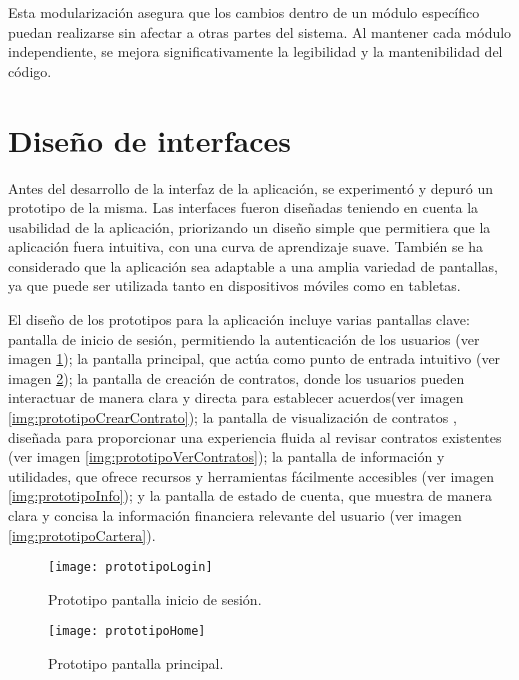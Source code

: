 Esta modularización asegura que los cambios dentro de un módulo específico puedan realizarse sin afectar a otras partes del sistema. Al mantener cada módulo independiente, se mejora significativamente la legibilidad y la mantenibilidad del código.

\section{Diseño de interfaces}

Antes del desarrollo de la interfaz de la aplicación, se experimentó y depuró un prototipo de la misma.
Las interfaces fueron diseñadas teniendo en cuenta la usabilidad de la aplicación, priorizando un diseño simple que permitiera que la aplicación fuera intuitiva, con una curva de aprendizaje suave.
También se ha considerado que la aplicación sea adaptable a una amplia variedad de pantallas, ya que puede ser utilizada tanto en dispositivos móviles como en tabletas.

El diseño de los prototipos para la aplicación incluye varias pantallas clave: pantalla de inicio de sesión, permitiendo la autenticación de los usuarios (ver imagen \ref{img:prototipoLogin}); la pantalla principal, que actúa como punto de entrada intuitivo (ver imagen \ref{img:prototipoHome}); la pantalla de creación de contratos, donde los usuarios pueden interactuar de manera clara y directa para establecer acuerdos(ver imagen \ref{img:prototipoCrearContrato}); la pantalla de visualización de contratos , diseñada para proporcionar una experiencia fluida al revisar contratos existentes (ver imagen \ref{img:prototipoVerContratos}); la pantalla de información y utilidades, que ofrece recursos y herramientas fácilmente accesibles (ver imagen \ref{img:prototipoInfo}); y la pantalla de estado de cuenta, que muestra de manera clara y concisa la información financiera relevante del usuario (ver imagen \ref{img:prototipoCartera}). 

\begin{figure}[h]
	\label{img:prototipoLogin}
	\centering
	\texttt{[image: prototipoLogin]}
	\caption[Prototipo pantalla inicio de sesión]{Prototipo pantalla inicio de sesión.}
\end{figure}

\begin{figure}[h]
	\label{img:prototipoHome}
	\centering
	\texttt{[image: prototipoHome]}
	\caption[Prototipo pantalla principal]{Prototipo pantalla principal.}
\end{figure}

